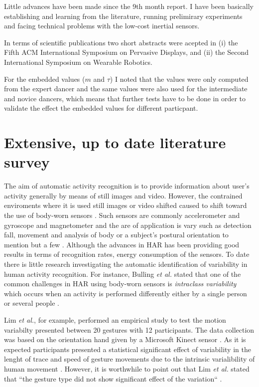 \documentclass[10pt,journal,onecolumn,compsoc]{IEEEtran}
\begin{document}
Little advances have been made since the 9th month report.
I have been basically establishing and learning 
from the literature, running prelimirary experiments 
and facing technical problems with the low-cost inertial sensors. 

In terms of scientific publications two short abstracts were acepted in
(i) the Fifth ACM International Symposium on Pervasive Displays, and 
(ii) the Second International Symposium on Wearable Robotics.

For the embedded values ($m$ and $\tau$) I noted that the values were 
only computed from the expert dancer and 
the same values were also used for the intermediate and novice dancers,
which means that further tests have to be done in order to validate the 
effect the embedded values for different particpant.


\appendices

\section{Extensive, up to date literature survey}


The aim of automatic activity recognition is to provide information about user's activity
generally by means of still images and video. However, the contrained enviroments
where it is used still images or video shifted 
caused to shift toward the use of body-worn sensors \cite{bulling2014}.
Such sensors are commonly accelerometer and gyroscope and magnetometer and 
the are of application is vary such as detection fall, movement and analysis of body 
or a subject's postural orientation to mention but a few \cite{Mukhopadhyay2014}.
Although the advances in HAR has been providing good results in terms of 
recognition rates, energy consumption of the sensors. 
To date there is little research investigating the automatic identification of variability in human activity recognition.
For instance, Bulling \textit{et al.} stated that one of the common challenges in HAR 
using body-worn sensors is \textit{intraclass variability} which occurs when 
an activity is performed differently either by a single person or several people \cite{bulling2014} . 

Lim \textit{et al.}, for example, performed an empirical study to test the motion variabilty 
presented between 20 gestures with 12 participants. %
The data collection was based on the orientation hand given by a Microsoft Kinect sensor \cite{Lim2012}. %
As it is expected 
participants presented a statistical significant effect of variability in the lenght of trace 
and speed of gesture movements due to the intrinsic varialibility of human movement  \cite{newell1993variability}.
However, it is worthwhile to point out that Lim \textit{et al.} stated that 
``the gesture type did not show significant effect of the variation`` \cite{Lim2012}.
\end{document}
